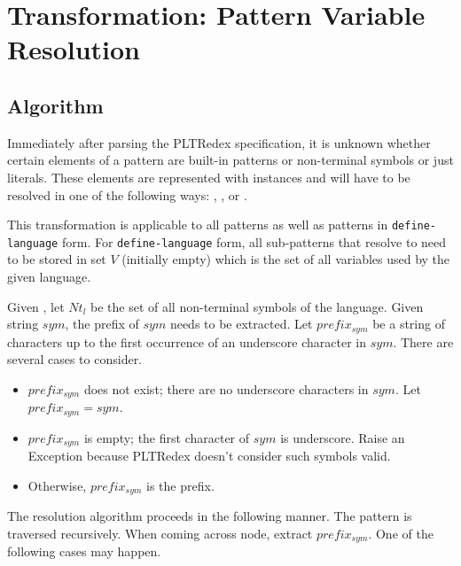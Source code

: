 \section{Transformation: Pattern Variable Resolution}
\label{section:pv-resolve}

\subsection{Algorithm}

Immediately after parsing the PLTRedex specification, it is unknown whether certain elements of a pattern are built-in patterns or non-terminal symbols or just literals. These elements are represented with \UnresolvedSymbol instances and will have to be resolved in one of the following ways: \BuiltInPatternNoArg, \NonTerminalNoArg, or \LiteralPatternNoArg.

This transformation is applicable to all patterns as well as patterns in \texttt{define-language} form. For \texttt{define-language} form, all sub-patterns that resolve to \LiteralPatternNoArg need to be stored in set $V$ (initially empty) which is the set of all variables used by the given language.

Given , let $\mathit{Nt_{l}}$ be the set of all non-terminal symbols of the language. Given string $sym$, the prefix of $\mathit{sym}$ needs to be extracted. Let $\mathit{prefix_{sym}}$ be a string of characters up to the first occurrence of an underscore character in $\mathit{sym}$. There are several cases to consider.

\begin{itemize}
\item $\mathit{prefix_{sym}}$ does not exist; there are no underscore characters in $\mathit{sym}$. Let $\mathit{prefix_{sym}=sym}$.
\item $\mathit{prefix_{sym}}$ is empty; the first character of $\mathit{sym}$ is underscore. Raise an Exception because PLTRedex doesn't consider such symbols valid.
\item Otherwise, $\mathit{prefix_{sym}}$ is the prefix.
\end{itemize}

The resolution algorithm proceeds in the following manner. The pattern is traversed recursively. When coming across \UnresolvedSymbol \space node, extract $\mathit{prefix_{sym}}$. One of the following cases may happen.

